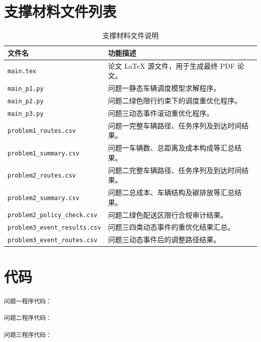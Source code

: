 \documentclass[withoutpreface,bwprint]{cumcmthesis} %
\newcommand{\file}[1]{\begingroup\urlstyle{same}\nolinkurl{#1}\endgroup}
\begin{document}
\newpage
\begin{appendices}

\section{支撑材料文件列表}

\begin{table}[H]
\centering
\caption{支撑材料文件说明}
\label{tab:file_list}
\small
\renewcommand{\arraystretch}{1.22}
\setlength{\tabcolsep}{6pt}
\begin{tabularx}{\textwidth}{
>{\RaggedRight\arraybackslash}p{4.6cm}
>{\RaggedRight\arraybackslash}X
}
\toprule
文件名 & 功能描述 \\
\midrule
\file{main.tex} & 论文 \LaTeX{} 源文件，用于生成最终 PDF 论文。 \\
\file{main_p1.py} & 问题一静态车辆调度模型求解程序。 \\
\file{main_p2.py} & 问题二绿色限行约束下的调度重优化程序。 \\
\file{main_p3.py} & 问题三动态事件滚动重优化程序。 \\
\file{problem1_routes.csv} & 问题一完整车辆路径、任务序列及到达时间结果。 \\
\file{problem1_summary.csv} & 问题一车辆数、总距离及成本构成等汇总结果。 \\
\file{problem2_routes.csv} & 问题二完整车辆路径、任务序列及到达时间结果。 \\
\file{problem2_summary.csv} & 问题二总成本、车辆结构及碳排放等汇总结果。 \\
\file{problem2_policy_check.csv} & 问题二绿色配送区限行合规审计结果。 \\
\file{problem3_event_results.csv} & 问题三四类动态事件的重优化结果汇总。 \\
\file{problem3_event_routes.csv} & 问题三动态事件后的调整路径结果。 \\
\bottomrule
\end{tabularx}
\end{table}

\section{代码}

\noindent\texttt{问题一程序代码：}



\noindent\texttt{问题二程序代码：}



\noindent\texttt{问题三程序代码：}



\end{appendices}
\end{document}
